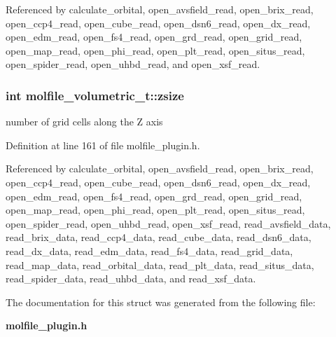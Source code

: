 Referenced by calculate\_\-orbital, open\_\-avsfield\_\-read, open\_\-brix\_\-read, open\_\-ccp4\_\-read, open\_\-cube\_\-read, open\_\-dsn6\_\-read, open\_\-dx\_\-read, open\_\-edm\_\-read, open\_\-fs4\_\-read, open\_\-grd\_\-read, open\_\-grid\_\-read, open\_\-map\_\-read, open\_\-phi\_\-read, open\_\-plt\_\-read, open\_\-situs\_\-read, open\_\-spider\_\-read, open\_\-uhbd\_\-read, and open\_\-xsf\_\-read.
\subsubsection{\setlength{\rightskip}{0pt plus 5cm}int molfile\_\-volumetric\_\-t::zsize}\label{structmolfile__volumetric__t_m7}


number of grid cells along the Z axis 

Definition at line 161 of file molfile\_\-plugin.h.

Referenced by calculate\_\-orbital, open\_\-avsfield\_\-read, open\_\-brix\_\-read, open\_\-ccp4\_\-read, open\_\-cube\_\-read, open\_\-dsn6\_\-read, open\_\-dx\_\-read, open\_\-edm\_\-read, open\_\-fs4\_\-read, open\_\-grd\_\-read, open\_\-grid\_\-read, open\_\-map\_\-read, open\_\-phi\_\-read, open\_\-plt\_\-read, open\_\-situs\_\-read, open\_\-spider\_\-read, open\_\-uhbd\_\-read, open\_\-xsf\_\-read, read\_\-avsfield\_\-data, read\_\-brix\_\-data, read\_\-ccp4\_\-data, read\_\-cube\_\-data, read\_\-dsn6\_\-data, read\_\-dx\_\-data, read\_\-edm\_\-data, read\_\-fs4\_\-data, read\_\-grid\_\-data, read\_\-map\_\-data, read\_\-orbital\_\-data, read\_\-plt\_\-data, read\_\-situs\_\-data, read\_\-spider\_\-data, read\_\-uhbd\_\-data, and read\_\-xsf\_\-data.

The documentation for this struct was generated from the following file:\begin{CompactItemize}
\item 
{\bf molfile\_\-plugin.h}\end{CompactItemize}

